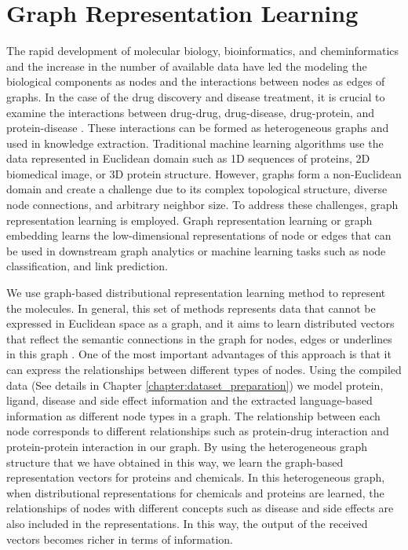 \section{Graph Representation Learning}
The rapid development of molecular biology, bioinformatics, and cheminformatics and the increase in the number of available data have led the modeling the biological components as nodes and the interactions between nodes as edges of graphs. In the case of the drug discovery and disease treatment, it is crucial to examine the interactions between drug-drug, drug-disease, drug-protein, and protein-disease \cite{daminelli2012drug, davis2009comparative}. These interactions can be formed as heterogeneous graphs and used in knowledge extraction. Traditional machine learning algorithms use the data represented in Euclidean domain such as 1D sequences of proteins, 2D biomedical image, or 3D protein structure. However, graphs form a non-Euclidean domain and create a challenge due to its complex topological structure, diverse node connections, and arbitrary neighbor size. To address these challenges, graph representation learning is employed. Graph representation learning or graph embedding learns the low-dimensional representations of node or edges that can be used in downstream graph analytics or machine learning tasks such as node classification, and link prediction.

We use graph-based distributional representation learning method to represent the molecules. In general, this set of methods represents data that cannot be expressed in Euclidean space as a graph, and it aims to learn distributed vectors that reflect the semantic connections in the graph for nodes, edges or underlines in this graph \cite{wu2019comprehensive}. One of the most important advantages of this approach is that it can express the relationships between different types of nodes. Using the compiled data (See details in Chapter \ref{chapter:dataset_preparation}) we model protein, ligand, disease and side effect information and the extracted language-based information as different node types in a graph. The relationship between each node corresponds to different relationships such as protein-drug interaction and protein-protein interaction in our graph. By using the heterogeneous graph structure that we have obtained in this way, we learn the graph-based representation vectors for proteins and chemicals. In this heterogeneous graph, when distributional representations for chemicals and proteins are learned, the relationships of nodes with different concepts such as disease and side effects are also included in the representations. In this way, the output of the received vectors becomes richer in terms of information. 

